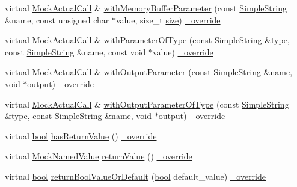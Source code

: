 \begin{DoxyCompactItemize}
\item 
virtual \hyperlink{class_mock_actual_call}{Mock\+Actual\+Call} \& \hyperlink{class_mock_checked_actual_call_a03587e4980f0678afdc425f92304c974}{with\+Memory\+Buffer\+Parameter} (const \hyperlink{class_simple_string}{Simple\+String} \&name, const unsigned char $\ast$value, size\+\_\+t \hyperlink{gst__avb__playbin_8c_a439227feff9d7f55384e8780cfc2eb82}{size}) \hyperlink{_cpp_u_test_config_8h_a049bea15dd750e15869863c94c1efc3b}{\+\_\+override}
\item 
virtual \hyperlink{class_mock_actual_call}{Mock\+Actual\+Call} \& \hyperlink{class_mock_checked_actual_call_a2877099d50761198a877cb2f333a2354}{with\+Parameter\+Of\+Type} (const \hyperlink{class_simple_string}{Simple\+String} \&type, const \hyperlink{class_simple_string}{Simple\+String} \&name, const void $\ast$value) \hyperlink{_cpp_u_test_config_8h_a049bea15dd750e15869863c94c1efc3b}{\+\_\+override}
\item 
virtual \hyperlink{class_mock_actual_call}{Mock\+Actual\+Call} \& \hyperlink{class_mock_checked_actual_call_a37088c117215f5ff1146cc68ec6db6ce}{with\+Output\+Parameter} (const \hyperlink{class_simple_string}{Simple\+String} \&name, void $\ast$output) \hyperlink{_cpp_u_test_config_8h_a049bea15dd750e15869863c94c1efc3b}{\+\_\+override}
\item 
virtual \hyperlink{class_mock_actual_call}{Mock\+Actual\+Call} \& \hyperlink{class_mock_checked_actual_call_a2933b347cf02c2909f6397dccd6c74d7}{with\+Output\+Parameter\+Of\+Type} (const \hyperlink{class_simple_string}{Simple\+String} \&type, const \hyperlink{class_simple_string}{Simple\+String} \&name, void $\ast$output) \hyperlink{_cpp_u_test_config_8h_a049bea15dd750e15869863c94c1efc3b}{\+\_\+override}
\item 
virtual \hyperlink{avb__gptp_8h_af6a258d8f3ee5206d682d799316314b1}{bool} \hyperlink{class_mock_checked_actual_call_afd6d7b809147f4ae665d5b4eb5b08431}{has\+Return\+Value} () \hyperlink{_cpp_u_test_config_8h_a049bea15dd750e15869863c94c1efc3b}{\+\_\+override}
\item 
virtual \hyperlink{class_mock_named_value}{Mock\+Named\+Value} \hyperlink{class_mock_checked_actual_call_a97defb904464d58fdd3e1c8f1d937fc6}{return\+Value} () \hyperlink{_cpp_u_test_config_8h_a049bea15dd750e15869863c94c1efc3b}{\+\_\+override}
\item 
virtual \hyperlink{avb__gptp_8h_af6a258d8f3ee5206d682d799316314b1}{bool} \hyperlink{class_mock_checked_actual_call_a6d855f19ca2a6b781989dfd8343a5926}{return\+Bool\+Value\+Or\+Default} (\hyperlink{avb__gptp_8h_af6a258d8f3ee5206d682d799316314b1}{bool} default\+\_\+value) \hyperlink{_cpp_u_test_config_8h_a049bea15dd750e15869863c94c1efc3b}{\+\_\+override}

\end{DoxyCompactItemize}
